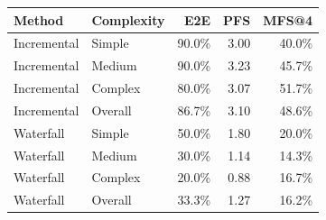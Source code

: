 \begin{tabular}{llrrr}
\toprule
Method & Complexity & E2E & PFS & MFS@4 \\
\midrule
Incremental & Simple & 90.0\% & 3.00 & 40.0\% \\
Incremental & Medium & 90.0\% & 3.23 & 45.7\% \\
Incremental & Complex & 80.0\% & 3.07 & 51.7\% \\
Incremental & Overall & 86.7\% & 3.10 & 48.6\% \\
Waterfall & Simple & 50.0\% & 1.80 & 20.0\% \\
Waterfall & Medium & 30.0\% & 1.14 & 14.3\% \\
Waterfall & Complex & 20.0\% & 0.88 & 16.7\% \\
Waterfall & Overall & 33.3\% & 1.27 & 16.2\% \\
\bottomrule
\end{tabular}
